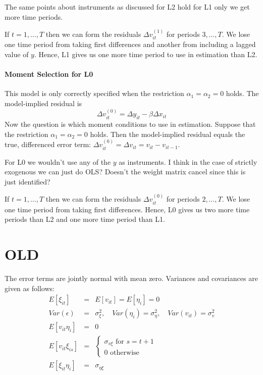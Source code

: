\documentclass[12pt]{article}
\begin{document}
The same points about instruments as discussed for L2 hold for L1 only we get more time periods.

If $t = 1, \hdots, T$ then we can form the residuals $\Delta v_{it}^{(1)}$ for periods $3, \hdots, T$. We lose one time period from taking first differences and another from including a lagged value of $y$. Hence, L1 gives us one more time period to use in estimation than L2.


\paragraph{Moment Selection for L0} This model is only correctly specified when the restriction $\alpha_1 = \alpha_2 = 0$ holds. The model-implied residual is
$$\Delta v_{it}^{(0)}= \Delta y_{it} -  \beta \Delta x_{it}$$
Now the question is which moment conditions to use in estimation. Suppose that the restriction $\alpha_1 = \alpha_2 = 0$ holds. Then the model-implied residual equals the true, differenced error term: $\Delta v_{it}^{(0)} = \Delta v_{it}= v_{it} - v_{it-1}$. 

For L0 we wouldn't use any of the $y$ as instruments. I think in the case of strictly exogenous we can just do OLS? Doesn't the weight matrix cancel since this is just identified?

If $t = 1, \hdots, T$ then we can form the residuals $\Delta v_{it}^{(0)}$ for periods $2, \hdots, T$. We lose one time period from taking first differences. Hence, L0 gives us two more time periods than L2 and one more time period than L1.





\newpage
\section*{OLD}
The error terms are jointly normal with mean zero. Variances and covariances are given as follows:
  \begin{eqnarray*}
    E[\xi_{it}] &=& E[v_{it}] = E[\eta_i] = 0\\
    Var(\epsilon) &=& \sigma^2_{\xi}, \quad Var(\eta_i) = \sigma^2_{\eta}, \quad Var(v_{it}) = \sigma^2_v\\
    E[v_{it}\eta_i] &=& 0 \\
    E[v_{it}\xi_{is}] &=& \left\{\begin{array}{l}\sigma_{v\xi} \mbox{ for } s = t+1 \\ 0 \mbox{ otherwise } \end{array} \right.\\
    E[\xi_{it}\eta_i] &=& \sigma_{\eta\xi}
  \end{eqnarray*}
\end{document}
